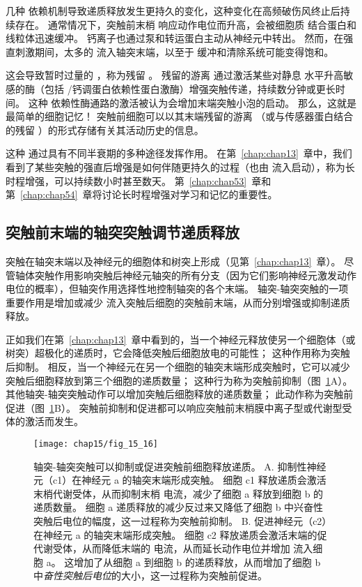 几种  依赖机制导致递质释放发生更持久的变化，这种变化在高频破伤风终止后持续存在。
通常情况下，突触前末梢  响应动作电位而升高，会被细胞质  结合蛋白和线粒体迅速缓冲。
钙离子也通过泵和转运蛋白主动从神经元中转出。
然而，在强直刺激期间，太多的  流入轴突末端，以至于  缓冲和清除系统可能变得饱和。


这会导致暂时过量的 ，称为残留 。
残留的游离  通过激活某些对静息  水平升高敏感的酶（包括 /钙调蛋白依赖性蛋白激酶）增强突触传递，持续数分钟或更长时间。
这种  依赖性酶通路的激活被认为会增加末端突触小泡的启动。
那么，这就是最简单的细胞记忆！
突触前细胞可以以其末端残留的游离 （或与传感器蛋白结合的残留 ）的形式存储有关其活动历史的信息。


这种  通过具有不同半衰期的多种途径发挥作用。 
在第~\ref{chap:chap13}~章中，我们看到了某些突触的强直后增强是如何伴随更持久的过程（也由  流入启动），称为长时程增强，可以持续数小时甚至数天。
第~\ref{chap:chap53}~章和第~\ref{chap:chap54}~章将讨论长时程增强对学习和记忆的重要性。



\subsection{突触前末端的轴突突触调节递质释放}

突触在轴突末端以及神经元的细胞体和树突上形成（见第~\ref{chap:chap13}~章）。
尽管轴体突触作用影响突触后神经元轴突的所有分支（因为它们影响神经元激发动作电位的概率），但轴突作用选择性地控制轴突的各个末端。
轴突-轴突突触的一项重要作用是增加或减少  流入突触后细胞的突触前末端，从而分别增强或抑制递质释放。


正如我们在第~\ref{chap:chap13}~章中看到的，当一个神经元释放使另一个细胞体（或树突）超极化的递质时，它会降低突触后细胞放电的可能性；
这种作用称为突触后抑制。
相反，当一个神经元在另一个细胞的轴突末端形成突触时，它可以减少突触后细胞释放到第三个细胞的递质数量；
这种行为称为突触前抑制（图~\ref{fig:15_16}A）。
其他轴突-轴突突触动作可以增加突触后细胞释放的递质数量；
此动作称为突触前促进（图~\ref{fig:15_16}B）。
突触前抑制和促进都可以响应突触前末梢膜中离子型或代谢型受体的激活而发生。


\begin{figure}[htbp]
	\centering
	\texttt{[image: chap15/fig\_15\_16]}
	\caption{轴突-轴突突触可以抑制或促进突触前细胞释放递质。
		A. 抑制性神经元（c1）在神经元 a 的轴突末端形成突触。
		细胞 c1 释放递质会激活末梢代谢受体，从而抑制末梢  电流，减少了细胞 a 释放到细胞 b 的递质数量。
		细胞 a 递质释放的减少反过来又降低了细胞 b 中兴奋性突触后电位的幅度，这一过程称为突触前抑制。
		B. 促进神经元（c2）在神经元 a 的轴突末端形成突触。
		细胞 c2 释放递质会激活末端的促代谢受体，从而降低末端的  电流，从而延长动作电位并增加  流入细胞 a。
		这增加了从细胞 a 到细胞 b 的递质释放，从而增加了细胞 b 中\textit{奋性突触后电位}的大小，这一过程称为突触前促进。}
	\label{fig:15_16}
\end{figure}



